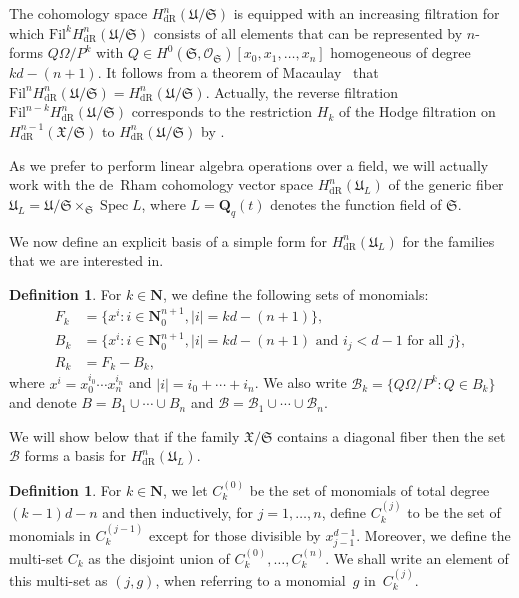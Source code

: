 \documentclass[a4paper,11pt]{article}
\numberwithin{equation}{section}
\providecommand{\abs}[1]{\lvert#1\rvert}                 %
\newcommand{\NN}{\mathbf{N}} %
\newcommand{\QQ}{\mathbf{Q}} %
\DeclareMathOperator{\Spec}{Spec}        %
\providecommand{\HdR}{H_{\text{dR}}}    %
\providecommand{\cB}{\mathcal{B}} %
\theoremstyle{definition}
\newtheorem{defn}[thm]{Definition}
\begin{document}
The cohomology space $\HdR^{n}(\mathfrak{U}/\mathfrak{S})$ is equipped with 
an increasing filtration for which $\mbox{Fil}^k \HdR^{n}(\mathfrak{U}/\mathfrak{S})$ consists of 
all elements that can be represented by $n$-forms $Q \Omega / P^k$ 
with $Q \in H^0(\mathfrak{S},\mathcal{O}_{\mathfrak{S}})[x_0, x_1, \dotsc, x_n]$ homogeneous of degree $kd - (n + 1)$. 
It follows from a theorem of Macaulay~\citep[\S 4, (4.11)]{Griffiths1969} 
that $\mbox{Fil}^n \HdR^{n}(\mathfrak{U}/\mathfrak{S})= \HdR^{n}(\mathfrak{U}/\mathfrak{S})$. 
Actually, the reverse filtration $\mbox{Fil}^{n-k} \HdR^{n}(\mathfrak{U}/\mathfrak{S})$
corresponds to the restriction $H_k$ of the Hodge filtration on $\HdR^{n-1}(\mathfrak{X}/\mathfrak{S})$ 
to $\HdR^{n}(\mathfrak{U}/\mathfrak{S})$ by \cite{Griffiths1969}.

As we prefer to perform linear 
algebra operations over a field, we will actually work with the de~Rham 
cohomology vector space $\HdR^{n}(\mathfrak{U}_L)$ of the generic fiber 
$\mathfrak{U}_L = \mathfrak{U}/\mathfrak{S} \times_{\mathfrak{S}} \Spec{L}$, 
where $L=\QQ_q(t)$ denotes the function field of $\mathfrak{S}$. 

We now define an explicit 
basis of a simple form for $\HdR^{n}(\mathfrak{U}_L)$ for the families 
that we are interested in.

\begin{defn} \label{defn:MonBasis}
For $k \in \NN$, we define the following sets of monomials: 
\begin{align*}
F_k & = \{ x^i : i \in \mathbf{N}_{0}^{n+1}, \abs{i} = k d - (n+1) \}, \\
B_k & = \{ x^i : i \in \mathbf{N}_{0}^{n+1}, \abs{i} = k d - (n+1) \text{ and $i_j < d-1$ for all $j$}\}, \\
R_k & = F_k - B_k,
\end{align*}
where $x^i = x_0^{i_0} \dotsm x_n^{i_n}$ and $\abs{i} = i_0 + \dotsb + i_n$. 
We also write $\cB_k = \{Q \Omega / P^k : Q \in B_k\}$ and denote
$B = B_1 \cup \dotsb \cup B_n$ and $\cB = \cB_1 \cup \dotsb \cup \cB_n$.
\end{defn}

We will show below that if the family $\mathfrak{X}/{\mathfrak{S}}$ contains 
a diagonal fiber then the set $\cB$ forms a basis for $\HdR^n(\mathfrak{U}_L)$.

\begin{defn} \label{defn:IndexSets}
For $k \in \NN$, we let $C_k^{(0)}$ be the set of monomials of total 
degree \\ 
$(k-1)d - n$ and then inductively, for $j = 1, \dotsc, n$, define 
$C_k^{(j)}$ to be the set of monomials in $C_k^{(j-1)}$ except for those 
divisible by $x_{j-1}^{d-1}$.  Moreover, we define the multi-set $C_k$ as 
the disjoint union of $C_k^{(0)}, \dotsc, C_k^{(n)}$.  We shall write an 
element of this multi-set as $(j, g)$, when referring to a monomial~$g$ 
in~$C_k^{(j)}$.
\end{defn}
\end{document}
